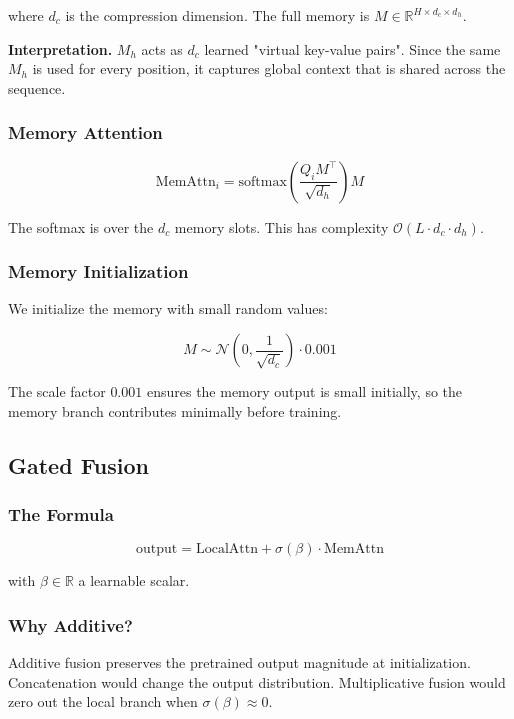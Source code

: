 where $d_c$ is the compression dimension. The full memory is 
$M \in \mathbb{R}^{H \times d_c \times d_h}$.

\textbf{Interpretation.} $M_h$ acts as $d_c$ learned "virtual key-value pairs". 
Since the same $M_h$ is used for every position, it captures global context 
that is shared across the sequence.

\subsubsection{Memory Attention}

\[
\text{MemAttn}_i = \text{softmax}\!\left(\frac{Q_i M^\top}{\sqrt{d_h}}\right) M
\tag{4.5}
\]

The softmax is over the $d_c$ memory slots. This has complexity 
$\mathcal{O}(L \cdot d_c \cdot d_h)$.

\subsubsection{Memory Initialization}

We initialize the memory with small random values:

\[
M \sim \mathcal{N}\!\left(0, \frac{1}{\sqrt{d_c}}\right) \cdot 0.001
\tag{4.6}
\]

The scale factor $0.001$ ensures the memory output is small initially, 
so the memory branch contributes minimally before training.

\subsection{Gated Fusion}

\subsubsection{The Formula}

\[
\text{output} = \text{LocalAttn} + \sigma(\beta) \cdot \text{MemAttn}
\tag{4.7}
\]

with $\beta \in \mathbb{R}$ a learnable scalar.

\subsubsection{Why Additive?}

Additive fusion preserves the pretrained output magnitude at initialization. 
Concatenation would change the output distribution. Multiplicative fusion 
would zero out the local branch when $\sigma(\beta) \approx 0$.

